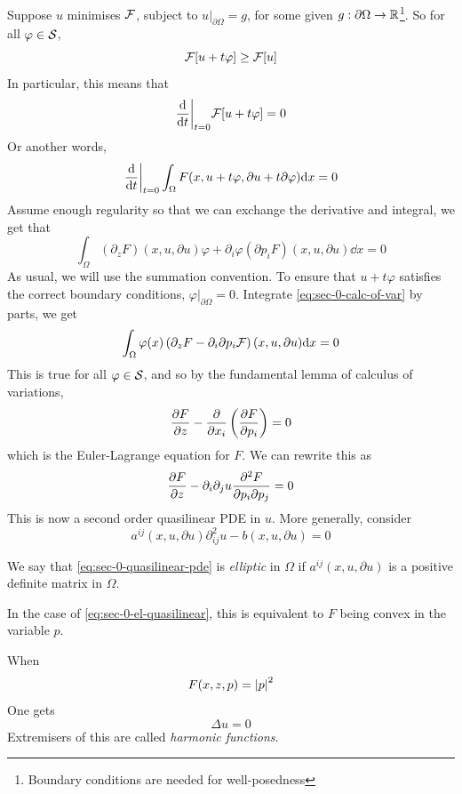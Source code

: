 \documentclass{article}
\begin{document}
Suppose \(u\) minimises \(\mathcal{F}\), subject to \(u \vert_{\partial\Omega} = g\), for some given \(g : \partial\Omega \to \mathbb{R}\)\footnote{Boundary conditions are needed for well-posedness}. So for all \(\varphi \in \mathcal{S}\),
\[\mathcal{F}[u + t\varphi] \ge \mathcal{F}[u]\]
In particular, this means that
\[\dv{t}\bigg\vert_{t=0}\mathcal{F}[u + t\varphi] = 0\]
Or another words,
\[\dv{t}\bigg\vert_{t=0}\int_\Omega F(x, u + t \varphi, \partial u + t\partial\varphi) \dd x = 0\]
Assume enough regularity so that we can exchange the derivative and integral, we get that
\begin{equation}
    \label{eq:sec-0-calc-of-var}
    \int_\Omega(\partial_zF)(x, u, \partial u) \varphi + \partial_i\varphi(\partial p_iF)(x, u, \partial u)\dd x = 0
\end{equation}
As usual, we will use the summation convention. To ensure that \(u + t\varphi\) satisfies the correct boundary conditions, \(\varphi\vert_{\partial\Omega} = 0\). Integrate \cref{eq:sec-0-calc-of-var} by parts, we get
\[\int_{\Omega}\varphi(x)\left(\partial_z F - \partial_i\partial p_i \mathcal{F}\right)(x, u, \partial u)\dd x = 0\]
This is true for all \(\varphi \in \mathcal{S}\), and so by the fundamental lemma of calculus of variations,
\[\pdv{F}{z} - \pdv{x_i}\left(\pdv{F}{p_i}\right) = 0\]
which is the Euler-Lagrange equation for \(F\). We can rewrite this as
\begin{equation}
    \label{eq:sec-0-el-quasilinear}
    \pdv{F}{z} - \partial_i\partial_j u \pdv[2]{F}{p_i}{p_j} = 0
\end{equation}
This is now a second order quasilinear PDE in \(u\). More generally, consider
\begin{equation}
    \label{eq:sec-0-quasilinear-pde}
    a^{ij}(x, u, \partial u)\partial^2_{ij}u - b(x, u, \partial u) = 0
\end{equation}

\begin{definition}
    We say that \cref{eq:sec-0-quasilinear-pde} is \emph{elliptic} in \(\Omega\) if \(a^{ij}(x, u, \partial u)\) is a positive definite matrix in \(\Omega\).
\end{definition}

In the case of \cref{eq:sec-0-el-quasilinear}, this is equivalent to \(F\) being convex in the variable \(p\).

\begin{example}
     When
    \[F(x, z, p) = \abs{p}^2\]
    One gets
    \[\Delta u = 0\]
    Extremisers of this are called \emph{harmonic functions}.
\end{example}
\end{document}
